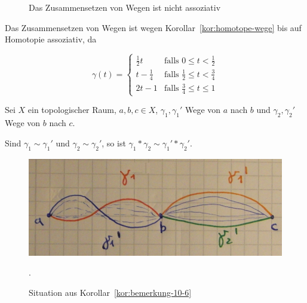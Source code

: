 \begin{beweis}
    \begin{figure}[ht]
        \centering

        \label{fig:assoziativitaet-von-wegen}
        \caption{Das Zusammensetzen von Wegen ist nicht assoziativ}
    \end{figure}

    Das Zusammensetzen von Wegen ist wegen Korollar~\ref{kor:homotope-wege}
    bis auf Homotopie assoziativ, da

    \[\gamma(t) = \begin{cases}
            \frac{1}{2} t   &\text{falls } 0 \leq t < \frac{1}{2}\\
            t - \frac{1}{4} &\text{falls } \frac{1}{2} \leq t < \frac{3}{4}\\
            2t - 1          &\text{falls } \frac{3}{4} \leq t \leq 1
        \end{cases}\]
\end{beweis}

\begin{korollar}\label{kor:bemerkung-10-6}
    Sei $X$ ein topologischer Raum, $a,b,c \in X$, $\gamma_1, \gamma_1'$
    Wege von $a$ nach $b$ und $\gamma_2, \gamma_2'$ Wege von $b$ nach $c$.

    Sind $\gamma_1 \sim \gamma_1'$ und $\gamma_2 \sim \gamma_2'$, so
    ist $\gamma_1 * \gamma_2 \sim \gamma_1 ' * \gamma_2'$.
\end{korollar}

\begin{figure}
    \centering
    \includegraphics[width=0.5\linewidth, keepaspectratio]{figures/todo/skizze-bemerkung-10-6.jpg}
    \caption{Situation aus Korollar~\ref{kor:bemerkung-10-6}}.
    \label{fig:situation-bemerkung-10-6}
\end{figure}

